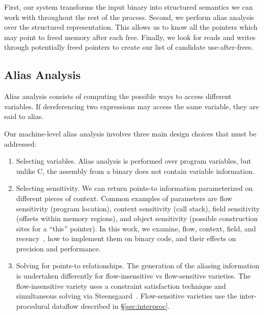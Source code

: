 First, our system transforms the input binary into structured
semantics we can work with throughout the rest of the process.
Second, we perform alias analysis over the structured representation.
This allows us to know all the pointers which may point to freed
memory after each free.  Finally, we look for reads and writes through
potentially freed pointers to create our list of candidate
use-after-frees.

\subsection{Alias Analysis}
Alias analysis consists of computing the possible ways to access different variables.
If dereferencing two expressions may access the same variable, they are said to alias.

Our machine-level alias analysis involves three main design choices that must be addressed:
\begin{enumerate}
\item Selecting variables.
  Alias analysis is performed over program variables, but unlike C, the assembly from a binary does not contain variable information.
\item Selecting sensitivity.
  We can return points-to information parameterized on different pieces of context.
  Common examples of parameters are flow sensitivity (program location), context sensitivity (call stack), field sensitivity (offsets within memory regions), and object sensitivity (possible construction sites for a ``this'' pointer).
  In this work, we examine, flow, context, field, and recency~\cite{vsa}, how to implement them on binary code, and their effects on precision and performance.
\item Solving for points-to relationships.
  The generation of the aliasing information is undertaken differently for flow-insensitive vs flow-sensitive varieties.
  The flow-insensitive variety uses a constraint satisfaction technique and simultaneous solving via Steensgaard~\cite{steensgaard-alias}.
  Flow-sensitive varieties use the inter-procedural dataflow described in \S \ref{sec:interproc}.
\end{enumerate}

